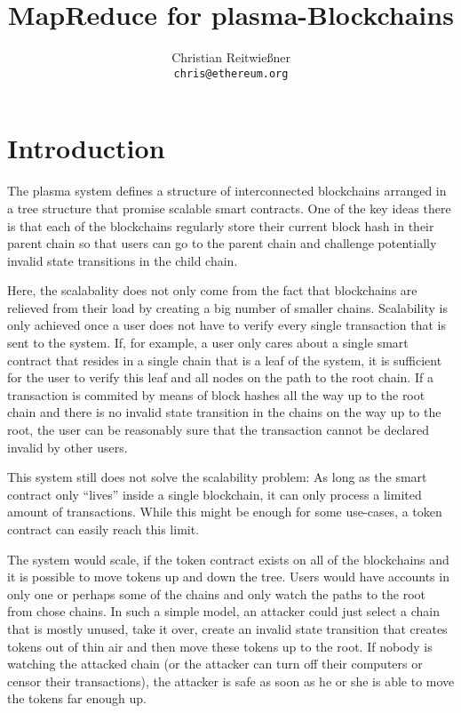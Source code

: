\documentclass[11pt,letterpaper]{article}
\date{}
\begin{document}


\title{MapReduce for plasma-Blockchains}

\author{Christian Reitwießner\\
{\tt chris@ethereum.org}}


\maketitle

\section{Introduction}

The plasma system \cite{plasma} defines a structure of interconnected blockchains
arranged in a tree structure that promise scalable smart contracts. One of the key
ideas there is that each of the blockchains regularly store their current block hash
in their parent chain so that users can go to the parent chain and challenge
potentially invalid state transitions in the child chain.

Here, the scalabality does not only come from the fact that blockchains are relieved
from their load by creating a big number of smaller chains. Scalability is only
achieved once a user does not have to verify every single transaction that is
sent to the system. If, for example, a user only cares about a single smart
contract that resides in a single chain that is a leaf of the system,
it is sufficient for the user to verify this leaf and all nodes on the 
path to the root chain. If a transaction is commited by means of block hashes
all the way up to the root chain and there is no invalid state transition in
the chains on the way up to the root, the user can be reasonably sure that
the transaction cannot be declared invalid by other users.

This system still does not solve the scalability problem: As long as
the smart contract only ``lives'' inside a single blockchain, it can
only process a limited amount of transactions. While this might be enough
for some use-cases, a token contract can easily reach this limit.

The system would scale, if the token contract exists on all of the blockchains
and it is possible to move tokens up and down the tree. Users would have accounts
in only one or perhaps some of the chains and only watch the paths to the root
from chose chains. In such a simple model, an attacker could just select a
chain that is mostly unused, take it over, create an invalid state transition
that creates tokens out of thin air and then move these tokens up to the root.
If nobody is watching the attacked chain (or the attacker can turn off their
computers or censor their transactions), the attacker is safe as soon as he
or she is able to move the tokens far enough up.
\end{document}

